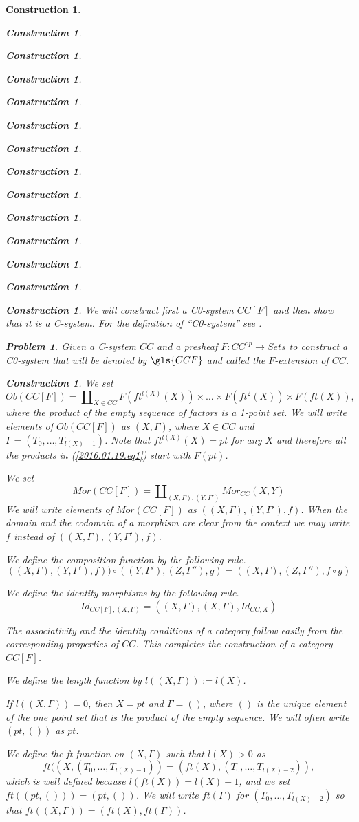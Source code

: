 \documentclass[onecolumn,12pt]{amsart}
\numberwithin{proposition}{subsection}
\newtheorem{problem}[proposition]{Problem}
\newtheorem{construction}[proposition]{Construction}
\newcommand{\sr}{\rightarrow}
\begin{document}
\begin{construction}
\begin{construction}
\begin{construction}
\begin{construction}
\begin{construction}
\begin{construction}
\begin{construction}
\begin{construction}
\begin{construction}
\begin{construction}
\begin{construction}
\begin{construction}
\begin{construction}
\begin{construction}
We will construct first a C0-system $CC[F]$ and then show that it is a
C-system. For the definition of ``C0-system'' see \cite[Definition
  2.1]{Csubsystems}.
%
\begin{problem}\label{2016.01.19.prob1}
Given a C-system $CC$ and a presheaf $F:CC^{op}\sr Sets$ to construct a
C0-system that will be denoted by $\gls{CCF}$ and called the {\em $F$-extension of $CC$}.
\end{problem}
%
\begin{construction}\rm\label{2016.01.19.constr1}
We set 
%
\begin{equation}\label{2016.01.19.eq1}
Ob(CC[F])=\amalg_{X\in CC} F(ft^{l(X)}(X))\times\dots\times F(ft^2(X))\times
F(ft(X)),
\end{equation}%
%
where the product of the empty sequence of factors is a 1-point set. We will
write elements of $Ob(CC[F])$ as $(X,\Gamma)$, where $X\in CC$ and
$\Gamma=(T_0,\dots,T_{l(X)-1})$. Note that $ft^{l(X)}(X)=pt$ for any $X$ and
therefore all the products in (\ref{2016.01.19.eq1}) start with $F(pt)$.

We set
%
$$Mor(CC[F])=\amalg_{(X,\Gamma),(Y,\Gamma')}Mor_{CC}(X,Y)$$
%
We will write elements of $Mor(CC[F])$ as $((X,\Gamma),(Y,\Gamma'),f)$. When
the domain and the codomain of a morphism are clear from the context we may
write $f$ instead of $((X,\Gamma),(Y,\Gamma'),f)$.

We define the composition function by the following rule.
%
$$((X,\Gamma),(Y,\Gamma'),f))\circ ((Y,\Gamma'),(Z,\Gamma''),g)=((X,\Gamma),(Z,\Gamma''),f\circ g)$$

We define the identity morphisms by the following rule.
%
$$Id_{CC[F],(X,\Gamma)}=((X,\Gamma),(X,\Gamma),Id_{CC,X})$$
%

The associativity and the identity conditions of a category follow easily from
the corresponding properties of $CC$. This completes the construction of a
category $CC[F]$.

We define the length function by $l((X,\Gamma)):=l(X)$.

If $l((X,\Gamma))=0$, then $X=pt$ and $\Gamma=()$, where $()$ is the unique
element of the one point set that is the product of the empty sequence. We will
often write $(pt,())$ as $pt$.

We define the ft-function on $(X,\Gamma)$ such that $l(X)>0$ as 
%
$$ft((X,(T_0,\dots,T_{l(X)-1}))=(ft(X),(T_0,\dots,T_{l(X)-2})),$$
%
which is well defined because $l(ft(X))=l(X)-1$, and we set
$ft((pt,()))=(pt,())$. We will write $ft(\Gamma)$ for $(T_0,\dots,T_{l(X)-2})$
so that $ft((X,\Gamma))=(ft(X),ft(\Gamma))$.


\end{construction}
\end{construction}
\end{construction}
\end{construction}
\end{construction}
\end{construction}
\end{construction}
\end{construction}
\end{construction}
\end{construction}
\end{construction}
\end{construction}
\end{construction}
\end{construction}
\end{construction}
\end{document}
